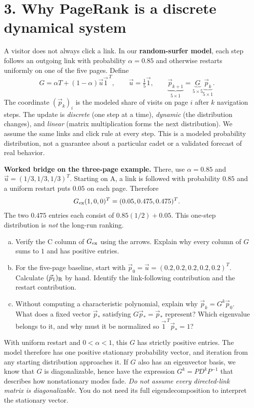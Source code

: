 \documentclass[10pt,letterpaper]{article}
\begin{document}
\section*{3. Why PageRank is a discrete dynamical system}
A visitor does not always click a link. In our \textbf{random-surfer model}, each step follows an outgoing link with probability $\alpha=0.85$ and otherwise restarts uniformly on one of the five pages. Define
\[
G=\alpha T+(1-\alpha)\vec u\vec 1^{\,T},\qquad
\vec u=\tfrac15\vec 1,\qquad
\underbrace{\vec p_{k+1}}_{5\times1}=\underbrace{G}_{5\times5}\underbrace{\vec p_k}_{5\times1}.
\]
The coordinate $(\vec p_k)_i$ is the modeled share of visits on page $i$ after $k$ navigation steps. The update is \emph{discrete} (one step at a time), \emph{dynamic} (the distribution changes), and \emph{linear} (matrix multiplication forms the next distribution). We assume the same links and click rule at every step. This is a modeled probability distribution, not a guarantee about a particular cadet or a validated forecast of real behavior.

\textbf{Worked bridge on the three-page example.} There, use $\alpha=0.85$ and $\vec u=(1/3,1/3,1/3)^T$. Starting on A, a link is followed with probability $0.85$ and a uniform restart puts $0.05$ on each page. Therefore
\[
G_{\rm ex}(1,0,0)^T=(0.05,0.475,0.475)^T.
\]
The two $0.475$ entries each consist of $0.85(1/2)+0.05$. This one-step distribution is \emph{not} the long-run ranking.

\begin{enumerate}[a.,leftmargin=*]
\item Verify the C column of $G_{\rm ex}$ using the arrows. Explain why every column of $G$ sums to $1$ and has positive entries.\\[0.48in]
\item For the five-page baseline, start with $\vec p_0=\vec u=(0.2,0.2,0.2,0.2,0.2)^T$. Calculate $(\vec p_1)_{\rm R}$ by hand. Identify the link-following contribution and the restart contribution.\\[0.52in]
\item Without computing a characteristic polynomial, explain why $\vec p_k=G^k\vec p_0$. What does a fixed vector $\vec p_*$ satisfying $G\vec p_*=\vec p_*$ represent? Which eigenvalue belongs to it, and why must it be normalized so $\vec 1^{\,T}\vec p_*=1$?\\[0.67in]
\end{enumerate}

With uniform restart and $0<\alpha<1$, this $G$ has strictly positive entries. The model therefore has one positive stationary probability vector, and iteration from any starting distribution approaches it. If $G$ also has an eigenvector basis, we know that $G$ is diagonalizable, hence have the expression $G^k=PD^kP^{-1}$ that describes how nonstationary modes fade. \emph{Do not assume every directed-link matrix is diagonalizable.} You do not need its full eigendecomposition to interpret the stationary vector.
\end{document}
